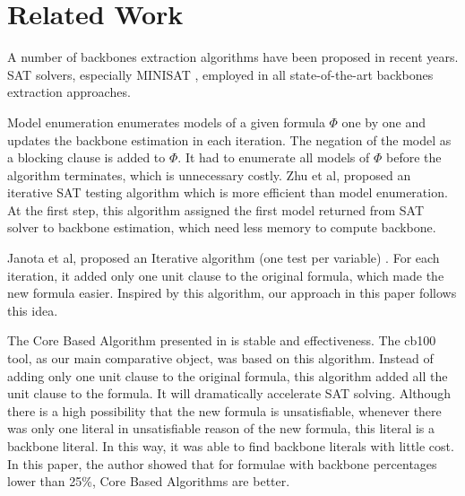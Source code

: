 \section{Related Work}\label{sec:relw}

A number of backbones extraction algorithms have been proposed in recent years. SAT solvers, especially MINISAT \cite{MINISAT}, employed in all state-of-the-art backbones extraction approaches.

Model enumeration\cite{MK2002,RSF2004} enumerates models of a given formula $\Phi$ one by one and updates the backbone estimation in each iteration. The negation of the model as a blocking clause is added to $\Phi$. It had to enumerate all models of $\Phi$ before the algorithm terminates, which is unnecessary costly.
Zhu et al, proposed an iterative SAT testing algorithm \cite{Z11} which is more efficient than model enumeration. At the first step, this algorithm assigned the first model returned from SAT solver to backbone estimation, which need less memory to compute backbone.

Janota et al, proposed an Iterative algorithm (one test per variable) \cite{JLM15}. For each iteration, it added only one unit clause to the original formula, which made the new formula easier. Inspired by this algorithm, our approach in this paper follows this idea.

The Core Based Algorithm presented in \cite{JLM15} is stable and effectiveness. The cb100 tool, as our main comparative object, was based on this algorithm. Instead of adding only one unit clause to the original formula, this algorithm added all the unit clause to the formula. It will dramatically accelerate SAT solving. Although there is a high possibility that the new formula is unsatisfiable, whenever there was only one literal in unsatisfiable reason of the new formula, this literal is a backbone literal. In this way, it was able to find backbone literals with little cost. In this paper, the author showed that for formulae with backbone percentages lower than 25\%, Core Based Algorithms are better.


